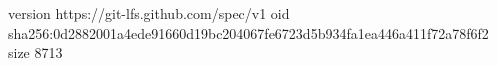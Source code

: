 version https://git-lfs.github.com/spec/v1
oid sha256:0d2882001a4ede91660d19bc204067fe6723d5b934fa1ea446a411f72a78f6f2
size 8713
